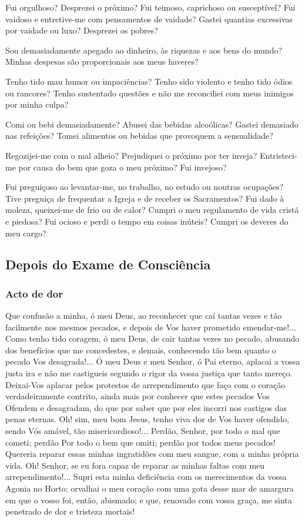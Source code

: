 Fui orgulhoso? Desprezei o próximo? Fui teimoso, caprichoso ou susceptível? Fui vaidoso e entretive-me com pensamentos de vaidade? Gastei quantias excessivas por vaidade ou luxo? Desprezei os pobres?

Sou demasiadamente apegado ao dinheiro, às riquezas e aos bens do mundo? Minhas despesas são proporcionais aos meus haveres?

Tenho tido mau humor ou impaciências? Tenho sido violento e tenho tido ódios ou rancores? Tenho sustentado questões e não me reconciliei com meus inimigos por minha culpa?

Comi ou bebi demasiadamente? Abusei das bebidas alcoólicas? Gastei demasiado nas refeições? Tomei alimentos ou bebidas que provoquem a sensualidade?

Regozijei-me com o mal alheio? Prejudiquei o próximo por ter inveja? Entristeci-me por causa do bem que goza o meu próximo? Fui invejoso?

Fui preguiçoso ao levantar-me, no trabalho, no estudo ou noutras ocupações? Tive preguiça de frequentar a Igreja e de receber os Sacramentos? Fui dado à moleza, queixei-me de frio ou de calor? Cumpri o meu regulamento de vida cristã e piedosa? Fui ocioso e perdi o tempo em coisas inúteis? Cumpri os deveres do meu cargo?

\subsection{Depois do Exame de Consciência}

\subsubsection{Acto de dor}

Que confusão a minha, ó meu Deus, ao reconhecer que caí tantas vezes e tão facilmente nos mesmos pecados, e depois de Vos haver prometido emendar-me!... Como tenho tido coragem, ó meu Deus, de cair tantas vezes no pecado, abusando dos benefícios que me concedestes, e demais, conhecendo tão bem quanto o pecado Vos desagrada!... Ó meu Deus e meu Senhor, ó Pai eterno, aplacai a vossa justa ira e não me castigueis segundo o rigor da vossa justiça que tanto mereço. Deixai-Vos aplacar pelos protestos de arrependimento que faço com o coração verdadeiramente contrito, ainda mais por conhecer que estes pecados Vos Ofendem e desagradam, do que por saber que por eles incorri nos castigos das penas eternas. Oh! sim, meu bom Jesus, tenho viva dor de Vos haver ofendido, sendo Vós amável, tão misericordioso!... Perdão, Senhor, por todo o mal que cometi; perdão Por todo o bem que omiti; perdão por todos meus pecados! Quereria reparar essas minhas ingratidões com meu sangue, com a minha própria vida. Oh! Senhor, se eu fora capaz de reparar as minhas faltas com meu arrependimento!... Supri esta minha deficiência com os merecimentos da vossa Agonia no Horto; orvalhai o meu coração com uma gota desse mar de amargura em que o vosso foi, então, abismado; e que, renovado com vossa graça, me sinta penetrado de dor e tristeza mortais!

